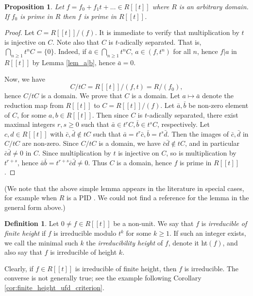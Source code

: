 \documentclass{article}
\theoremstyle{plain}
\newtheorem{proposition}[theorem]{Proposition}
\theoremstyle{definition}
\newtheorem{definition}[theorem]{Definition}
\theoremstyle{remark}
\theoremstyle{plain}
\begin{document}
\begin{proposition}
\label{prime2} Let $f = f_0+f_1t+\ldots \in R[[t]]$ where $R$ is an arbitrary domain. If $f_0$ is prime in $R$ then $f$ is prime in $R[[t]]$. \end{proposition}
\begin{proof}
Let $C = R[[t]]/(f)$. It is immediate to verify that multiplication by $t$ is injective on $C$. Note also that $C$ is $t$-adically separated. That is, $\bigcap_{n \geq 1}t^n C = \{0\}$. Indeed, if  $\bar{a} \in \bigcap_{n \geq 1}t^n C$, $a \in (f,t^n)$ for all $n$, hence $f|a$ in $R[[t]]$ by Lemma \ref{lem_a|b}, hence $\bar{a} = 0$.

Now, we have 
$$C/tC  = R[[t]]/(f,t) = R/(f_0),$$
hence $C/tC$ is a domain. We prove that $C$ is a domain. Let $a \mapsto \bar{a}$ denote the reduction map from $R[[t]]$ to $C = R[[t]]/(f)$. Let $\bar{a},\bar{b}$ be non-zero element of $C$, for some $a,b \in R[[t]]$. Then since $C$ is $t$-adically separated, there exist maximal integers $r,s \geq 0$ such that $\bar{a} \in t^r C, \bar{b} \in t^s C$, respectively. Let $c,d \in R[[t]]$ with $\bar{c},\bar{d} \notin tC$ such that $\bar{a} = t^r\bar{c},\bar{b} = t^s \bar{d}$. Then the images of $\bar{c},\bar{d}$ in $C/tC$ are non-zero. Since $C/tC$ is a domain, we have $\bar{c}\bar{d} \notin tC$, and in particular $\bar{c}\bar{d} \neq 0$ in $C$. Since multiplication by $t$ is injective on $C$, so is multiplication by $t^{r+s}$, hence $\bar{a}\bar{b} = t^{r+s}\bar{c}\bar{d} \neq 0$. Thus $C$ is a domain, hence $f$ is prime in $R[[t]]$.

\end{proof}

(We note that the above simple lemma appears in the literature in special cases, for example when $R$ is a PID \cite[Section 3]{Elliott14}. We could not find a reference for the lemma in the general form above.)

\begin{definition}
       
    Let $0\neq f \in R[[t]]$ be a non-unit. We say that $f$ is {\it irreducible of finite height} if $f$ is irreducible modulo $t^k$ for some $k \geq 1$. If such an integer exists, we call the minimal such $k$ the {\it irreducibility height} of $f$, denote it ht$(f)$, and also say that $f$ is irreducible of height $k$. 
\end{definition}

\noindent Clearly, if $f \in R[[t]]$ is irreducible of finite height, then $f$ is irreducible. The converse is not generally true; see the example following Corollary \ref{cor:finite_height_ufd_criterion}. %
\end{document}
